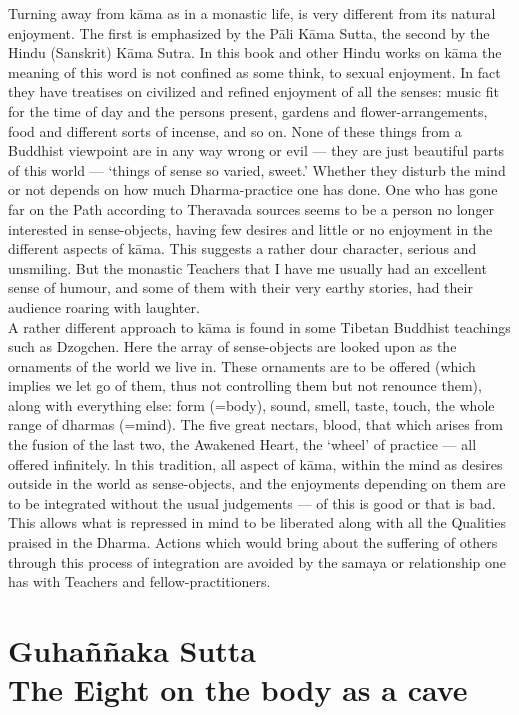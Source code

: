 Turning away from k\=ama as in a monastic life, is very different from its natural enjoyment. The first is emphasized by the P\=ali K\=ama Sutta, the second by the Hindu (Sanskrit) K\=ama Sutra. In this book and other Hindu works on k\=ama the meaning of this word is not confined as some think, to sexual enjoyment. In fact they have treatises on civilized and refined enjoyment of all the senses: music ﬁt for the time of day and the persons present, gardens and ﬂower-arrangements, food and different sorts of incense, and so on. None of these things from a Buddhist viewpoint are in any way wrong or evil — they are just beautiful parts of this world — `things of sense so varied, sweet.' Whether they disturb the mind or not depends on how much Dharma-practice one has done. One who has gone far on the Path according to Theravada sources seems to be a person no longer interested in sense-objects, having few desires and little or no enjoyment in the different aspects of k\=ama. This suggests a rather dour character, serious and unsmiling. But the monastic Teachers that I have me usually had an excellent sense of humour, and some of them with their very earthy stories, had their audience roaring with laughter.\\

A rather different approach to k\=ama is found in some Tibetan Buddhist teachings such as Dzogchen. Here the array of sense-objects are looked upon as the ornaments of the world we live in. These ornaments are to be offered (which implies we let go of them, thus not controlling them but not renounce them), along with everything else: form (=body), sound, smell, taste, touch, the whole range of dharmas (=mind). The five great nectars, blood, that which arises from the fusion of the last two, the Awakened Heart, the `wheel' of practice — all offered infinitely. ln this tradition, all aspect of k\=ama, within the mind as desires outside in the world as sense-objects, and the enjoyments depending on them are to be integrated without the usual judgements — of this is good or that is bad. This allows what is repressed in mind to be liberated along with all the Qualities praised in the Dharma. Actions which would bring about the suffering of others through this process of integration are avoided by the samaya or relationship one has with Teachers and fellow-practitioners.

\chapter{Guha\~n\~naka Sutta\\ The Eight on the body as a cave}


